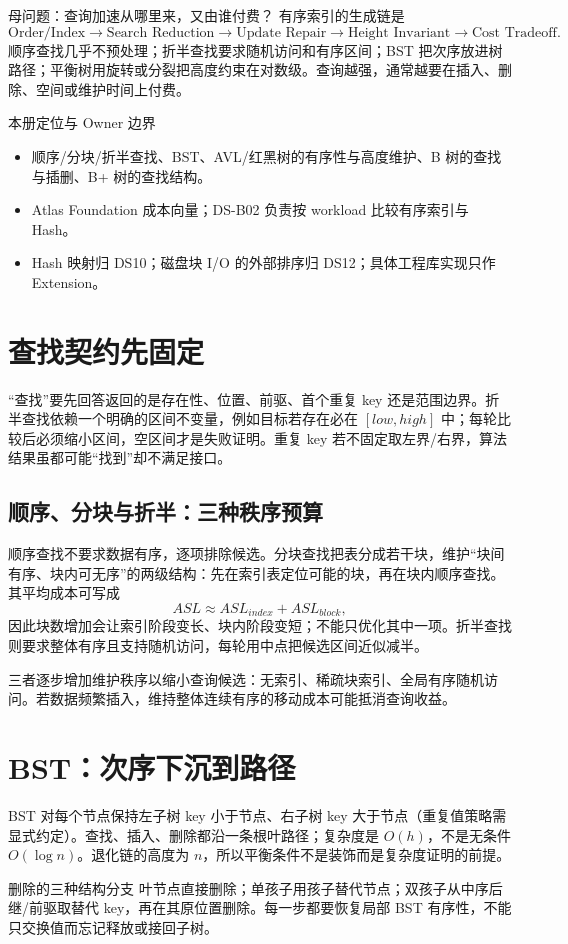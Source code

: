 \documentclass[UTF8,fontset=none,11pt,a4paper]{ctexart}
\begin{document}

\begin{corebox}{母问题：查询加速从哪里来，又由谁付费？}
有序索引的生成链是
\[
\text{Order/Index}\to\text{Search Reduction}\to\text{Update Repair}\to\text{Height Invariant}\to\text{Cost Tradeoff}.
\]
顺序查找几乎不预处理；折半查找要求随机访问和有序区间；BST 把次序放进树路径；平衡树用旋转或分裂把高度约束在对数级。查询越强，通常越要在插入、删除、空间或维护时间上付费。
\end{corebox}
\begin{methodbox}{本册定位与 Owner 边界}
\begin{itemize}
\item {}顺序/分块/折半查找、BST、AVL/红黑树的有序性与高度维护、B 树的查找与插删、B+ 树的查找结构。
\item {}Atlas Foundation 成本向量；DS-B02 负责按 workload 比较有序索引与 Hash。
\item {}Hash 映射归 DS10；磁盘块 I/O 的外部排序归 DS12；具体工程库实现只作 Extension。
\end{itemize}
\end{methodbox}
\tableofcontents\newpage

\section{查找契约先固定}
“查找”要先回答返回的是存在性、位置、前驱、首个重复 key 还是范围边界。折半查找依赖一个明确的区间不变量，例如目标若存在必在 $[low,high]$ 中；每轮比较后必须缩小区间，空区间才是失败证明。重复 key 若不固定取左界/右界，算法结果虽都可能“找到”却不满足接口。

\subsection{顺序、分块与折半：三种秩序预算}
顺序查找不要求数据有序，逐项排除候选。分块查找把表分成若干块，维护“块间有序、块内可无序”的两级结构：先在索引表定位可能的块，再在块内顺序查找。其平均成本可写成
\[
ASL\approx ASL_{index}+ASL_{block},
\]
因此块数增加会让索引阶段变长、块内阶段变短；不能只优化其中一项。折半查找则要求整体有序且支持随机访问，每轮用中点把候选区间近似减半。

三者逐步增加维护秩序以缩小查询候选：无索引、稀疏块索引、全局有序随机访问。若数据频繁插入，维持整体连续有序的移动成本可能抵消查询收益。

\section{BST：次序下沉到路径}
BST 对每个节点保持左子树 key 小于节点、右子树 key 大于节点（重复值策略需显式约定）。查找、插入、删除都沿一条根叶路径；复杂度是 $O(h)$，不是无条件 $O(\log n)$。退化链的高度为 $n$，所以平衡条件不是装饰而是复杂度证明的前提。
\begin{examplebox}{删除的三种结构分支}
叶节点直接删除；单孩子用孩子替代节点；双孩子从中序后继/前驱取替代 key，再在其原位置删除。每一步都要恢复局部 BST 有序性，不能只交换值而忘记释放或接回子树。
\end{examplebox}
\end{document}
